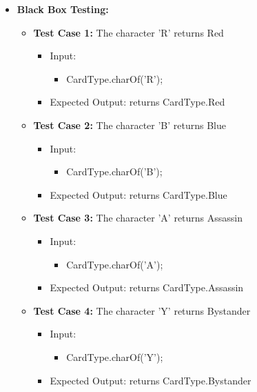\documentclass[12pt]{article}
\begin{document}
\begin{itemize}
    \item \textbf{Black Box Testing:}
    \begin{itemize}
       \item \textbf{Test Case 1:} The character 'R' returns Red
            \begin{itemize}
            \item Input: 
                \begin{itemize}
                    \item CardType.charOf('R');
                \end{itemize}
            \item Expected Output: returns CardType.Red
            \end{itemize}
      \item \textbf{Test Case 2:} The character 'B' returns Blue
            \begin{itemize}
            \item Input: 
                \begin{itemize}
                    \item CardType.charOf('B');
                \end{itemize}
            \item Expected Output: returns CardType.Blue
            \end{itemize}
        \item \textbf{Test Case 3:} The character 'A' returns Assassin
            \begin{itemize}
            \item Input: 
                \begin{itemize}
                    \item CardType.charOf('A');
                \end{itemize}
            \item Expected Output: returns CardType.Assassin
            \end{itemize}
            
    \item \textbf{Test Case 4:} The character 'Y' returns Bystander
            \begin{itemize}
            \item Input: 
                \begin{itemize}
                    \item CardType.charOf('Y');
                \end{itemize}
            \item Expected Output: returns CardType.Bystander
            \end{itemize}
      
    \end{itemize}
\end{itemize}
\end{document}
